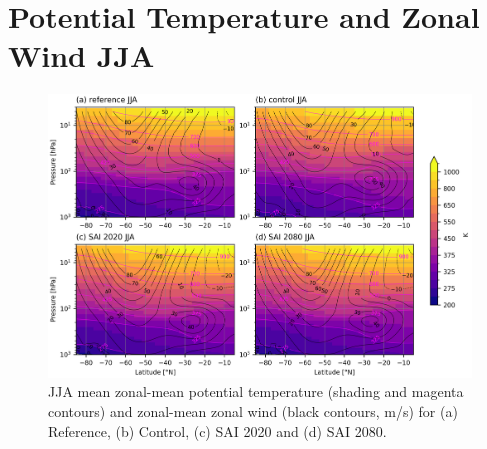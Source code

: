 \section{Potential Temperature and Zonal Wind JJA}\label{app_th_U_JJA}

\begin{figure}[H]
	\centering
	\includegraphics[width=0.95\linewidth]{images/th_U_zm_JJA.png}
	\caption{JJA mean zonal-mean potential temperature (shading and magenta contours) and zonal-mean zonal wind (black contours, m/s) for (a) Reference, (b) Control, (c) SAI 2020 and (d) SAI 2080.}
	\label{fig:th_U_zm_JJA}
\end{figure}